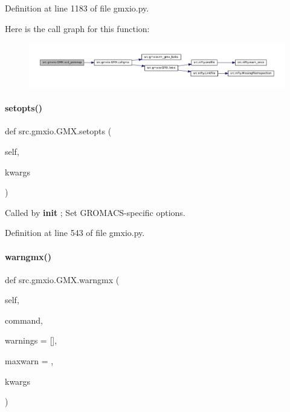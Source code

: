 Definition at line 1183 of file gmxio.\+py.

Here is the call graph for this function\+:
\nopagebreak
\begin{figure}[H]
\begin{center}
\leavevmode
\includegraphics[width=350pt]{classsrc_1_1gmxio_1_1GMX_a8aeaf687eee94c8da3fb33c1e22802d6_cgraph}
\end{center}
\end{figure}
\mbox{\label{classsrc_1_1gmxio_1_1GMX_a585636f44e08bca144cadbe8755f37f2}} 
\paragraph{\texorpdfstring{setopts()}{setopts()}}
{\footnotesize\ttfamily def src.\+gmxio.\+G\+M\+X.\+setopts (\begin{DoxyParamCaption}\item[{}]{self,  }\item[{}]{kwargs }\end{DoxyParamCaption})}



Called by {\bfseries init} ; Set G\+R\+O\+M\+A\+C\+S-\/specific options. 



Definition at line 543 of file gmxio.\+py.

\mbox{\label{classsrc_1_1gmxio_1_1GMX_a24343e631722ec863df94641493128a9}} 
\paragraph{\texorpdfstring{warngmx()}{warngmx()}}
{\footnotesize\ttfamily def src.\+gmxio.\+G\+M\+X.\+warngmx (\begin{DoxyParamCaption}\item[{}]{self,  }\item[{}]{command,  }\item[{}]{warnings = {\ttfamily \mbox{[}\mbox{]}},  }\item[{}]{maxwarn = {},  }\item[{}]{kwargs }\end{DoxyParamCaption})}



